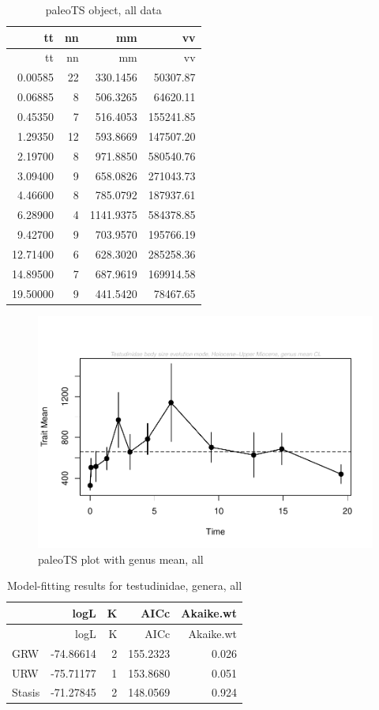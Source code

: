 \documentclass[]{article}
\begin{document}
\begin{longtable}[]{@{}rrrr@{}}
\caption{paleoTS object, all data}\tabularnewline
\toprule
tt & nn & mm & vv\tabularnewline
\midrule
\endfirsthead
\toprule
tt & nn & mm & vv\tabularnewline
\midrule
\endhead
0.00585 & 22 & 330.1456 & 50307.87\tabularnewline
0.06885 & 8 & 506.3265 & 64620.11\tabularnewline
0.45350 & 7 & 516.4053 & 155241.85\tabularnewline
1.29350 & 12 & 593.8669 & 147507.20\tabularnewline
2.19700 & 8 & 971.8850 & 580540.76\tabularnewline
3.09400 & 9 & 658.0826 & 271043.73\tabularnewline
4.46600 & 8 & 785.0792 & 187937.61\tabularnewline
6.28900 & 4 & 1141.9375 & 584378.85\tabularnewline
9.42700 & 9 & 703.9570 & 195766.19\tabularnewline
12.71400 & 6 & 628.3020 & 285258.36\tabularnewline
14.89500 & 7 & 687.9619 & 169914.58\tabularnewline
19.50000 & 9 & 441.5420 & 78467.65\tabularnewline
\bottomrule
\end{longtable}

\begin{figure}[htbp]
\centering
\includegraphics{MA_JJ_files/figure-latex/paleoTSAll-1.pdf}
\caption{paleoTS plot with genus mean, all}
\end{figure}

\begin{longtable}[]{@{}lrrrr@{}}
\caption{Model-fitting results for testudinidae, genera,
all}\tabularnewline
\toprule
& logL & K & AICc & Akaike.wt\tabularnewline
\midrule
\endfirsthead
\toprule
& logL & K & AICc & Akaike.wt\tabularnewline
\midrule
\endhead
GRW & -74.86614 & 2 & 155.2323 & 0.026\tabularnewline
URW & -75.71177 & 1 & 153.8680 & 0.051\tabularnewline
Stasis & -71.27845 & 2 & 148.0569 & 0.924\tabularnewline
\bottomrule
\end{longtable}
\end{document}
